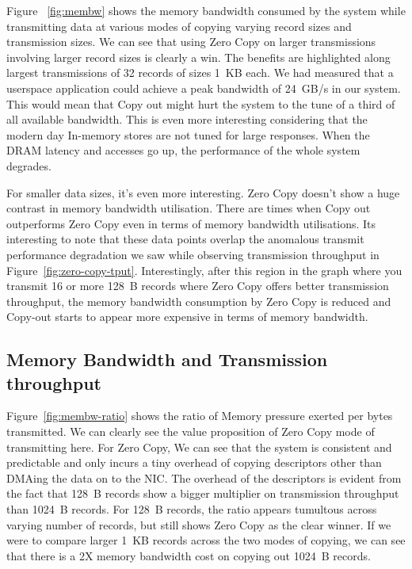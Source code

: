 

Figure ~\ref{fig:membw} shows the memory bandwidth consumed by the system while transmitting data at various modes 
of copying varying record sizes and transmission sizes. We can see that using Zero Copy on larger transmissions involving 
larger record sizes is clearly a win. The benefits are highlighted along largest transmissions of 32 records of sizes 1~KB each. 
 We had measured that a userspace application could achieve a peak bandwidth of 24~GB/s in our system. This would mean that Copy out 
 might hurt the system to the tune of a third of all available bandwidth. This is even more interesting considering that the modern day 
 In-memory stores are not tuned for large responses. When the DRAM latency and accesses go up, the performance of the whole system degrades.

For smaller data sizes, it's even more interesting. Zero Copy doesn't show a huge contrast in memory bandwidth utilisation. There are times 
when Copy out outperforms Zero Copy even in terms of memory bandwidth utilisations. Its interesting to note that these data points overlap the anomalous transmit performance 
degradation we saw while observing transmission throughput in Figure~\ref{fig:zero-copy-tput}. Interestingly, after this region in the graph 
where you transmit 16 or more 128~B records where Zero Copy offers better transmission throughput, the memory bandwidth consumption by Zero Copy 
is reduced and Copy-out starts to appear more expensive in terms of memory bandwidth. 


\subsection{Memory Bandwidth and Transmission throughput}

Figure~\ref{fig:membw-ratio} shows the ratio of Memory pressure exerted per bytes transmitted. We can clearly see the value proposition of 
Zero Copy mode of transmitting here. For Zero Copy, We can see that the system is consistent and predictable and only incurs a tiny overhead of 
copying descriptors other than DMAing the data on to the NIC. The overhead of the descriptors is evident from the fact that 128~B records show 
a bigger multiplier on transmission throughput than 1024~B records. For 128~B records, the ratio appears tumultous across varying number of records, 
 but still shows Zero Copy as the clear winner. If we were to compare larger 1~KB records across the two modes of copying, we can see that there is a 
 2X memory bandwidth cost on copying out 1024~B records.

